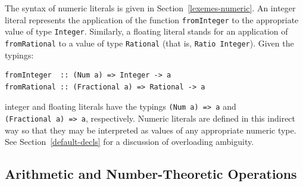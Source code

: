 The syntax of numeric literals is given in
Section~\ref{lexemes-numeric}.  An integer literal represents the
application
of the function \mbox{\tt fromInteger} to the appropriate
value of type 
\mbox{\tt Integer}.  Similarly, a floating literal stands for an application of
\mbox{\tt fromRational} to a value of type \mbox{\tt Rational} (that is, 
\mbox{\tt Ratio\ Integer}).  Given the typings:
\bprog
{\small\begin{verbatim}
fromInteger  :: (Num a) => Integer -> a
fromRational :: (Fractional a) => Rational -> a
\end{verbatim}}
\eprog{}%
integer and floating literals have the
typings \mbox{\tt (Num\ a)\ =>\ a} and \mbox{\tt (Fractional\ a)\ =>\ a}, respectively.
Numeric literals are defined in this indirect way so that they may be
interpreted as values of any appropriate numeric type.
See Section~\ref{default-decls} for a discussion of overloading ambiguity.

\subsection{Arithmetic and Number-Theoretic Operations}
\label{arithmetic-operators}


